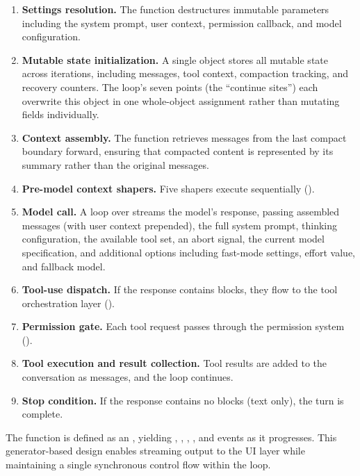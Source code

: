 \begin{enumerate}[nosep]
  \item \textbf{Settings resolution.} The  function destructures immutable parameters including the system prompt, user context, permission callback, and model configuration.
  \item \textbf{Mutable state initialization.} A single  object stores all mutable state across iterations, including messages, tool context, compaction tracking, and recovery counters. The loop's seven  points (the ``continue sites'') each overwrite this object in one whole-object assignment rather than mutating fields individually.
  \item \textbf{Context assembly.} The function  retrieves messages from the last compact boundary forward, ensuring that compacted content is represented by its summary rather than the original messages.
  \item \textbf{Pre-model context shapers.} Five shapers execute sequentially ().
  \item \textbf{Model call.} A  loop over  streams the model's response, passing assembled messages (with user context prepended), the full system prompt, thinking configuration, the available tool set, an abort signal, the current model specification, and additional options including fast-mode settings, effort value, and fallback model.
  \item \textbf{Tool-use dispatch.} If the response contains  blocks, they flow to the tool orchestration layer ().
  \item \textbf{Permission gate.} Each tool request passes through the permission system ().
  \item \textbf{Tool execution and result collection.} Tool results are added to the conversation as  messages, and the loop continues.
  \item \textbf{Stop condition.} If the response contains no  blocks (text only), the turn is complete.
\end{enumerate}

The  function is defined as an , yielding , , , , and  events as it progresses. This generator-based design enables streaming output to the UI layer while maintaining a single synchronous control flow within the loop.

